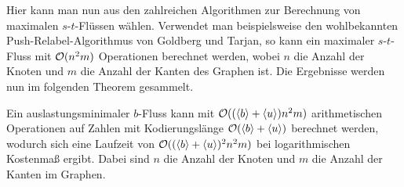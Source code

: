 Hier kann man nun aus den zahlreichen Algorithmen zur Berechnung von maximalen $s$-$t$-Flüssen wählen.
Verwendet man beispielsweise den wohlbekannten Push-Relabel-Algorithmus von Goldberg und Tarjan,  so kann ein maximaler $s$-$t$-Fluss mit $\mathcal{O}(n^2 m)$ Operationen berechnet werden, wobei $n$ die Anzahl der Knoten und $m$ die Anzahl der Kanten des Graphen ist.
Die Ergebnisse werden nun im folgenden Theorem gesammelt.

\begin{theorem}\label{thm-compute-minimal-con-flow}
	Ein auslastungsminimaler $b$-Fluss kann mit $\mathcal{O}((\langle b\rangle+\langle u\rangle) n^2 m)$ arithmetischen Operationen auf Zahlen mit Kodierungslänge $\mathcal{O}(\langle b\rangle + \langle u\rangle)$ berechnet werden, wodurch sich eine Laufzeit von $\mathcal{O}((\langle b\rangle+\langle u\rangle)^2 n^2 m)$ bei logarithmischen Kostenmaß ergibt.
	Dabei sind $n$ die Anzahl der Knoten und $m$ die Anzahl der Kanten im Graphen.
\end{theorem}